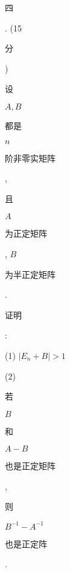 \documentclass[10pt]{article}
\begin{document}
\begin{CJK}{UTF8}{mj}四\end{CJK}. (15 \begin{CJK}{UTF8}{mj}分\end{CJK}) \begin{CJK}{UTF8}{mj}设\end{CJK} $A, B$ \begin{CJK}{UTF8}{mj}都是\end{CJK} $n$ \begin{CJK}{UTF8}{mj}阶非零实矩阵\end{CJK}, \begin{CJK}{UTF8}{mj}且\end{CJK} $A$ \begin{CJK}{UTF8}{mj}为正定矩阵\end{CJK}, $B$ \begin{CJK}{UTF8}{mj}为半正定矩阵\end{CJK}. \begin{CJK}{UTF8}{mj}证明\end{CJK}:

(1) $\left|E_{n}+B\right|>1$

(2) \begin{CJK}{UTF8}{mj}若\end{CJK} $B$ \begin{CJK}{UTF8}{mj}和\end{CJK} $A-B$ \begin{CJK}{UTF8}{mj}也是正定矩阵\end{CJK}, \begin{CJK}{UTF8}{mj}则\end{CJK} $B^{-1}-A^{-1}$ \begin{CJK}{UTF8}{mj}也是正定阵\end{CJK}.
\end{document}
